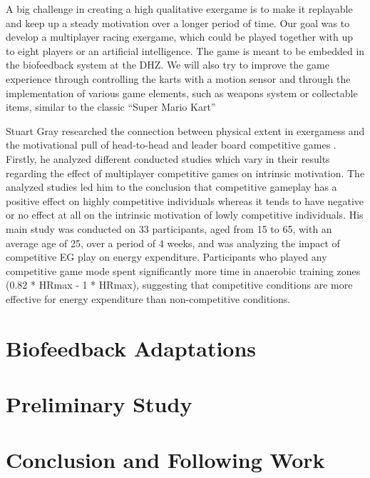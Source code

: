 \begin{multicols}{2}
A big challenge in creating a high qualitative exergame is to make it replayable and keep up a steady motivation over a longer period of time. Our goal was to develop a multiplayer racing exergame, which could be played together with up to eight players or an artificial intelligence. The game is meant to be embedded in the biofeedback system at the DHZ. We will also try to improve the game experience through controlling the karts with a motion sensor and through the implementation of various game elements, such as weapons system or collectable items, similar to the classic “Super Mario Kart” %

Stuart Gray researched the connection between physical extent in exergamess and the motivational pull of head-to-head and leader board competitive games \cite{Gray2013}. Firstly, he analyzed different conducted studies which vary in their results regarding the effect of multiplayer competitive games on intrinsic motivation. The analyzed studies led him to the conclusion that competitive gameplay has a positive effect on highly competitive individuals whereas it tends to have negative or no effect at all on the intrinsic motivation of lowly competitive individuals. His main study was conducted on 33 participants, aged from 15 to 65, with an average age of 25, over a period of 4 weeks, and was analyzing the impact of competitive EG play on energy expenditure. Participants who played any competitive game mode spent significantly more time in anaerobic training zones (0.82 * HRmax - 1 * HRmax), suggesting that competitive conditions are more effective for energy expenditure than non-competitive conditions.


\section{Biofeedback Adaptations}

\section{Preliminary Study}

\section{Conclusion and Following Work}


\end{multicols}








